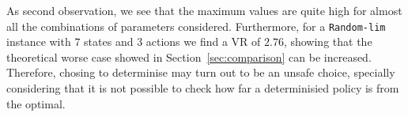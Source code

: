 %

As second observation, we see that the maximum values are quite high for almost all the combinations of parameters considered. Furthermore, for a \texttt{Random-lim} instance with $7$ states and $3$ actions we find a VR of $2.76$, showing that the theoretical worse case showed in Section~\ref{sec:comparison} can be increased. 
%
Therefore, chosing to determinise may turn out to be an unsafe choice, specially considering that it is not possible to check how far a determinisied policy is from the optimal.  






